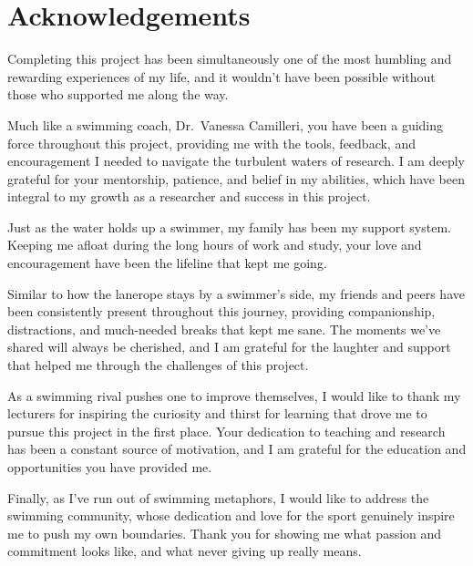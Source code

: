 \chapter*{Acknowledgements}

Completing this project has been simultaneously one of the most humbling and rewarding experiences of my life, and it wouldn't have been possible without those who supported me along the way.

Much like a swimming coach, Dr.\ Vanessa Camilleri, you have been a guiding force throughout this project, providing me with the tools, feedback, and encouragement I needed to navigate the turbulent waters of research. I am deeply grateful for your mentorship, patience, and belief in my abilities, which have been integral to my growth as a researcher and success in this project.

Just as the water holds up a swimmer, my family has been my support system. Keeping me afloat during the long hours of work and study, your love and encouragement have been the lifeline that kept me going.

Similar to how the lanerope stays by a swimmer's side, my friends and peers have been consistently present throughout this journey, providing companionship, distractions, and much-needed breaks that kept me sane. The moments we've shared will always be cherished, and I am grateful for the laughter and support that helped me through the challenges of this project.

As a swimming rival pushes one to improve themselves, I would like to thank my lecturers for inspiring the curiosity and thirst for learning that drove me to pursue this project in the first place. Your dedication to teaching and research has been a constant source of motivation, and I am grateful for the education and opportunities you have provided me. %

Finally, as I've run out of swimming metaphors, I would like to address the swimming community, whose dedication and love for the sport genuinely inspire me to push my own boundaries. Thank you for showing me what passion and commitment looks like, and what never giving up really means.
